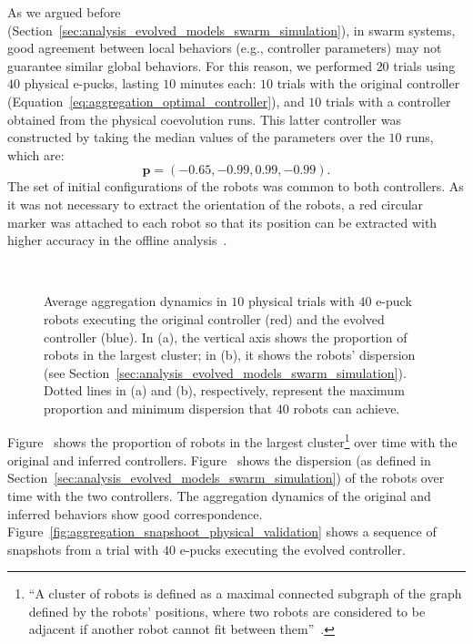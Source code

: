 As we argued before (Section~\ref{sec:analysis_evolved_models_swarm_simulation}), in swarm systems, good agreement between local behaviors (e.g., controller parameters) may not guarantee similar global behaviors. For this reason, we performed $20$ trials using $40$ physical e-pucks, lasting $10$ minutes each: $10$ trials with the original controller (Equation~\eqref{eq:aggregation_optimal_controller}), and $10$ trials with a controller obtained from the physical coevolution runs. This latter controller was constructed by taking the median values of the parameters over the $10$ runs, which are:
$$
\mathbf{p}=\left(-0.65, -0.99, 0.99, -0.99\right).
$$
The set of initial configurations of the robots was common to both controllers. As it was not necessary to extract the orientation of the robots, a red circular marker was attached to each robot so that its position can be extracted with higher accuracy in the offline analysis~\cite{Gauci2014_ijrr}.
%
\begin{figure}[!t]%
	\centering
		\\
		\caption{Average aggregation dynamics in $10$ physical trials with $40$ e-puck robots executing the original controller (red) and the evolved controller (blue). In (a), the vertical axis shows the proportion of robots in the largest cluster; in (b), it shows the robots' dispersion (see Section~\ref{sec:analysis_evolved_models_swarm_simulation}). Dotted lines in (a) and (b), respectively, represent the maximum proportion and minimum dispersion that $40$ robots can achieve.}
		\label{fig:aggregation_dynamics_physical}
\end{figure}
%
Figure~ shows the proportion of robots in the largest cluster\footnote{``A cluster of robots is defined as a maximal connected subgraph of the graph defined by the robots' positions, where two robots are considered to be adjacent if another robot cannot fit between them''~\cite{Gauci2014_ijrr}.} over time with the original and inferred controllers. Figure~ shows the dispersion (as defined in Section~\ref{sec:analysis_evolved_models_swarm_simulation}) of the robots over time with the two controllers. The aggregation dynamics of the original and inferred behaviors show good correspondence. Figure~\ref{fig:aggregation_snapshoot_physical_validation} shows a sequence of snapshots from a trial with $40$ e-pucks executing the evolved controller.


